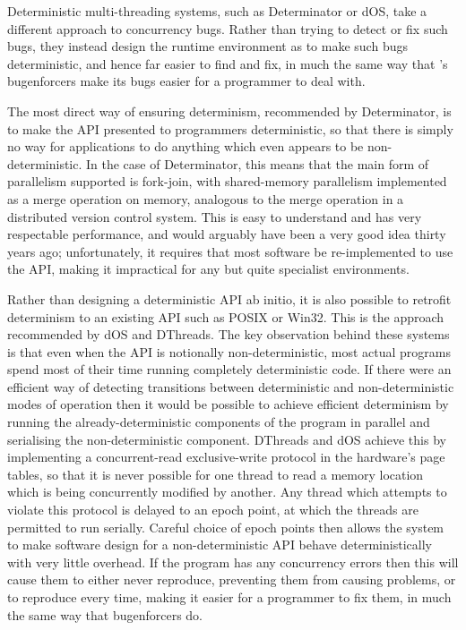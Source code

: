 Deterministic multi-threading systems, such as
Determinator\cite{Aviram2010} or dOS\cite{Bergan2010}, take a
different approach to concurrency bugs.  Rather than trying to detect
or fix such bugs, they instead design the runtime environment as to
make such bugs deterministic, and hence far easier to find and fix, in
much the same way that {\technique}'s \glspl{bugenforcer} make its
bugs easier for a programmer to deal with.

The most direct way of ensuring determinism, recommended by
Determinator, is to make the API presented to programmers
deterministic, so that there is simply no way for applications to do
anything which even appears to be non-deterministic.  In the case of
Determinator, this means that the main form of parallelism supported
is fork-join, with shared-memory parallelism implemented as a merge
operation on memory, analogous to the merge operation in a distributed
version control system\cite{Hamano2013}.  This is easy to understand
and has very respectable performance, and would arguably have been a
very good idea thirty years ago; unfortunately, it requires that most
software be re-implemented to use the API, making it impractical for
any but quite specialist environments.

 Rather than designing a
deterministic API ab initio, it is also possible to
retrofit determinism to an existing API such as POSIX or Win32.  This
is the approach recommended by dOS\cite{Bergan2010} and
DThreads\cite{Liu2011}.  The key observation behind these systems is
that even when the API is notionally non-deterministic, most actual
programs spend most of their time running completely deterministic
code.  If there were an efficient way of detecting transitions between
deterministic and non-deterministic modes of operation then it would
be possible to achieve efficient determinism by running the
already-deterministic components of the program in parallel and
serialising the non-deterministic component.  DThreads and dOS achieve
this by implementing a concurrent-read exclusive-write protocol in the
hardware's page tables\cite[Chapter 4: Paging]{Intel2009}, so that it
is never possible for one thread to read a memory location which is
being concurrently modified by another.  Any thread which attempts to
violate this protocol is delayed to an epoch point, at which the
threads are permitted to run serially.  Careful choice of epoch points
then allows the system to make software design for a non-deterministic
API behave deterministically with very little overhead.  If the
program has any concurrency errors then this will cause them to either
never reproduce, preventing them from causing problems, or to
reproduce every time, making it easier for a programmer to fix them,
in much the same way that {\technique} \glspl{bugenforcer} do.

